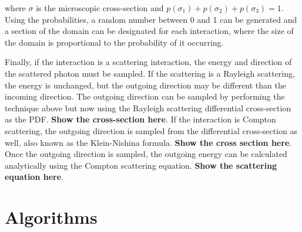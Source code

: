 \documentclass[10pt]{article}
\begin{document}
\noindent where $\sigma$ is the microscopic cross-section and $p(\sigma_1) + p(\sigma_2) + p(\sigma_3) = 1$. Using the probabilities, a random number between 0 and 1 can be generated and a section of the domain can be designated for each interaction, where the size of the domain is proportional to the probability of it occurring.

Finally, if the interaction is a scattering interaction, the energy and direction of the scattered photon must be sampled. If the scattering is a Rayleigh scattering, the energy is unchanged, but the outgoing direction may be different than the incoming direction. The outgoing direction can be sampled by performing the technique above but now using the Rayleigh scattering differential cross-section as the PDF. \textbf{Show the cross-section here}. If the interaction is Compton scattering, the outgoing direction is sampled from the differential cross-section as well, also known as the Klein-Nishina formula. \textbf{Show the cross section here}. Once the outgoing direction is sampled, the outgoing energy can be calculated analytically using the Compton scattering equation. \textbf{Show the scattering equation here}. 






\section{Algorithms}
\end{document}
